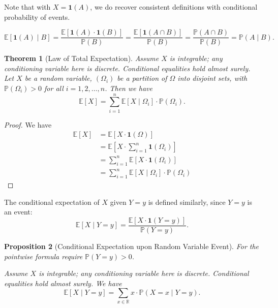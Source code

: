 \documentclass[11pt]{article}
\numberwithin{equation}{section}
\newtheorem{theorem}{Theorem}[section]
\newtheorem{proposition}[theorem]{Proposition}
\theoremstyle{definition}
\theoremstyle{remark}
\newcommand{\pqty}[1]{\left(#1\right)}
\newcommand{\bqty}[1]{\left[#1\right]}
\newcommand{\RR}{\mathbb R}
\newcommand{\indicator}{\mathbf 1}
\newcommand{\Prob}{\mathbb P}
\newcommand{\Expt}{\mathbb E}
\newcommand{\Conditional}[2]{#1\mid #2}
\begin{document}
Note that with \(X = \indicator\pqty{A}\), we do recover consistent definitions with conditional probability of events.

\[
    \Expt\bqty{\Conditional{\indicator\pqty{A}}{B}} = \frac{\Expt\bqty{\indicator\pqty{A} \cdot \indicator\pqty{B}}}{\Prob\pqty{B}} = \frac{\Expt\bqty{\indicator\pqty{A \cap B}}}{\Prob\pqty{B}} = \frac{\Prob\pqty{A \cap B}}{\Prob\pqty{B}} = \Prob\pqty{\Conditional{A}{B}}.
\]

\begin{theorem}[Law of Total Expectation]\label{probability-theorem-010}
    \label{probability-thm:law-of-total-expectation}
Assume \(X\) is integrable; any conditioning variable here is discrete. Conditional equalities hold almost surely.
%
    Let \(X\) be a random variable, \(\pqty{\Omega_i}\) be a partition of \(\Omega\) into disjoint sets, with \(\Prob\pqty{\Omega_i} > 0\) for all \(i = 1, 2, \ldots ,n\). Then we have
    \[
        \Expt\bqty{X} = \sum_{i = 1}^{n} \Expt\bqty{\Conditional{X}{\Omega_i}} \cdot \Prob\pqty{\Omega_i}.
    \]
\end{theorem}

\begin{proof}\label{probability-proof-033}
    We have
    \begin{align*}
        \Expt\bqty{X} &= \Expt\bqty{X \cdot \indicator\pqty{\Omega}} \\
        &= \Expt\bqty{X \cdot \sum_{i = 1}^{n} \indicator \pqty{\Omega_i}} \\
        &= \sum_{i = 1}^{n} \Expt\bqty{X \cdot \indicator \pqty{\Omega_i}} \\
        &= \sum_{i = 1}^{n} \Expt\bqty{\Conditional{X}{\Omega_i}} \cdot \Prob\pqty{\Omega_i}
    \end{align*}
\end{proof}

The conditional expectation of \(X\) given \(Y = y\) is defined similarly, since \(Y = y\) is an event:
\[
    \Expt\bqty{\Conditional{X}{Y = y}} = \frac{\Expt\bqty{X \cdot \indicator\pqty{Y = y}}}{\Prob\pqty{Y = y}}.
\]

\begin{proposition}[Conditional Expectation upon Random Variable Event]\label{probability-proposition-017}
    \label{probability-prop:conditional-expectation-random-variable}
For the pointwise formula require \(\Prob(Y=y)>0\).

Assume \(X\) is integrable; any conditioning variable here is discrete. Conditional equalities hold almost surely.
%
    We have
    \[
        \Expt\bqty{\Conditional{X}{Y = y}} = \sum_{x \in \RR} x \cdot \Prob\pqty{\Conditional{X = x}{Y = y}}.
    \]
\end{proposition}
\end{document}
